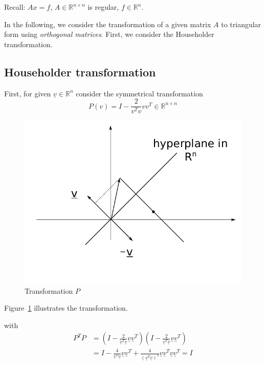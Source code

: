 \documentclass{article}
\begin{document}
Recall: $Ax = f$, $A \in \mathbb R^{n\times n}$ is regular, $f \in \mathbb R^n$.

In the following, we consider the transformation of a given matrix $A$ to triangular form using \emph{orthogonal matrices}.
First, we consider the Householder transformation.

\subsection{Householder transformation}

First, for given $\underline{v} \in \mathbb R^n$ consider the symmetrical transformation
\[ P(v) = I - \frac{2}{v^T v} v v^T \in \mathbb R^{n\times n} \]

\begin{figure}[t]
  \begin{center}
    \includegraphics{img/06_transformation_P.pdf}
    \caption{Transformation $P$}
    \label{fig:transP}
  \end{center}
\end{figure}

Figure~\ref{fig:transP} illustrates the transformation.

with
\begin{align*}
  P^T P &= \left(I - \frac{2}{\underline{v}^T \underline{v}} \underline{v} \underline{v}^T\right) \left(I - \frac{2}{\underline{v}^T \underline{v}} \underline{v} \underline{v}^T\right) \\
    &= I - \frac{4}{\underline{v}^T \underline{v}} \underline{v} \underline{v}^T + \frac{4}{(\underline{v}^T \underline{v})^2} \underline{v} \underline{v}^T \underline{v} \underline{v}^T = I
\end{align*}
\end{document}
